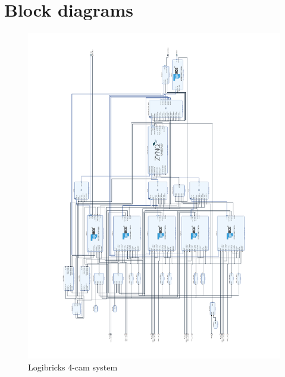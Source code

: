 \chapter{Block diagrams}
\begin{figure}
    \centering
    \includegraphics[width=\linewidth]{assets/hp130ac.pdf}
    \caption{Logibricks 4-cam system}
    \label{fig:4_cam_logic}
\end{figure}


